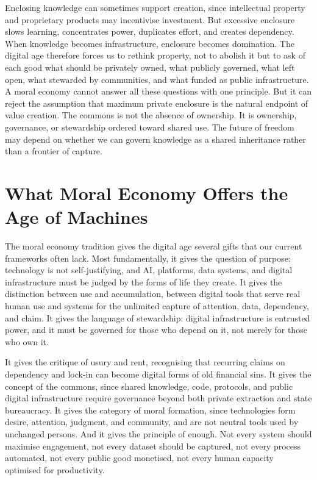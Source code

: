 \documentclass[11pt,a4paper,oneside]{book}
\begin{document}
Enclosing knowledge can sometimes support creation, since intellectual property and proprietary products may incentivise investment. But excessive enclosure slows learning, concentrates power, duplicates effort, and creates dependency. When knowledge becomes infrastructure, enclosure becomes domination. The digital age therefore forces us to rethink property, not to abolish it but to ask of each good what should be privately owned, what publicly governed, what left open, what stewarded by communities, and what funded as public infrastructure. A moral economy cannot answer all these questions with one principle. But it can reject the assumption that maximum private enclosure is the natural endpoint of value creation. The commons is not the absence of ownership. It is ownership, governance, or stewardship ordered toward shared use. The future of freedom may depend on whether we can govern knowledge as a shared inheritance rather than a frontier of capture.

\section*{What Moral Economy Offers the Age of Machines}

The moral economy tradition gives the digital age several gifts that our current frameworks often lack. Most fundamentally, it gives the question of purpose: technology is not self-justifying, and AI, platforms, data systems, and digital infrastructure must be judged by the forms of life they create. It gives the distinction between use and accumulation, between digital tools that serve real human use and systems for the unlimited capture of attention, data, dependency, and claim. It gives the language of stewardship: digital infrastructure is entrusted power, and it must be governed for those who depend on it, not merely for those who own it.

It gives the critique of usury and rent, recognising that recurring claims on dependency and lock-in can become digital forms of old financial sins. It gives the concept of the commons, since shared knowledge, code, protocols, and public digital infrastructure require governance beyond both private extraction and state bureaucracy. It gives the category of moral formation, since technologies form desire, attention, judgment, and community, and are not neutral tools used by unchanged persons. And it gives the principle of enough. Not every system should maximise engagement, not every dataset should be captured, not every process automated, not every public good monetised, not every human capacity optimised for productivity.
\end{document}
